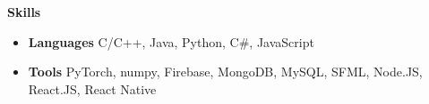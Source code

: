 \documentclass[letterpaper,12pt]{article}[leftmargin=*]
\makeatletter
\def \entryspacing {-0pt}
\renewcommand{\section}[2]{\vspace{6pt}
  \colorbox{secondary}{\color{white}\raggedbottom\normalsize\textbf{{#1}{\hspace{7pt}#2}}}
}
\newcommand{\resumeEntryStart}{\begin{itemize}[leftmargin=2.5mm]}
\newcommand{\resumeEntryEnd}{\end{itemize}\vspace{\entryspacing}}
\newcommand{\resumeItemListStart}{\begin{itemize}[leftmargin=4.5mm]}
\newcommand{\resumeItemListEnd}{\end{itemize}}
\newcommand{\resumeItem}[1]{
  \item\small{
    {#1 \vspace{-3pt}}
  }
}
\newcommand{\resumeEntryTSDL}[4]{
  \vspace{-1pt}\item[]
    \begin{tabularx}{0.97\textwidth}{X@{\hspace{60pt}}r}
      \textbf{\color{primary}#1} & {\firabook\color{accent}\small#2} \\
      \textit{\color{accent}\small#3} & \textit{\color{accent}\small#4} \\
    \end{tabularx}\vspace{-6pt}
}
\newcommand{\resumeEntryS}[2]{
  \item[]\small{
    \textbf{\color{primary}#1 }{ #2 \vspace{-6pt}}
  }
}
\makeatother
\begin{document}

    
\section{\faGears}{Skills}
\resumeEntryStart
 \resumeEntryS{Languages } {C/C++, Java, Python, C\#, JavaScript}
 \resumeEntryS{Tools } {PyTorch, numpy, Firebase, MongoDB, MySQL, SFML, Node.JS, React.JS, React Native}
\resumeEntryEnd
\end{document}
